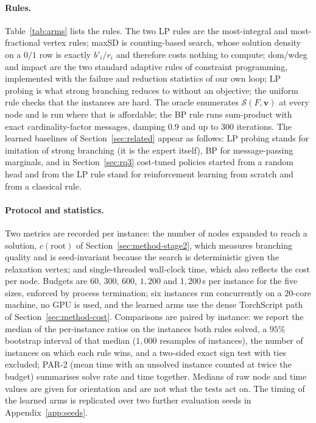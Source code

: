 \documentclass[final,5p,times,twocolumn,authoryear]{elsarticle}
\newcommand{\SOL}{\mathcal{S}}
\begin{document}
\paragraph{Rules.} Table~\ref{tab:arms} lists the rules. The two LP rules are the most-integral and most-fractional vertex rules; maxSD is counting-based search, whose solution density on a $0/1$ row is exactly $b'_i/r_i$ and therefore costs nothing to compute; dom/wdeg and impact are the two standard adaptive rules of constraint programming, implemented with the failure and reduction statistics of our own loop; LP probing is what strong branching reduces to without an objective; the uniform rule checks that the instances are hard. The oracle enumerates $\SOL(F,\mathbf{v})$ at every node and is run where that is affordable; the BP rule runs sum-product with exact cardinality-factor messages, damping $0.9$ and up to $300$ iterations. The learned baselines of Section~\ref{sec:related} appear as follows: LP probing stands for imitation of strong branching (it is the expert itself), BP for message-passing marginals, and in Section~\ref{sec:rq3} cost-tuned policies started from a random head and from the LP rule stand for reinforcement learning from scratch and from a classical rule.

\paragraph{Protocol and statistics.} Two metrics are recorded per instance: the number of nodes expanded to reach a solution, $c(\text{root})$ of Section~\ref{sec:method-stage2}, which measures branching quality and is seed-invariant because the search is deterministic given the relaxation vertex; and single-threaded wall-clock time, which also reflects the cost per node. Budgets are $60$, $300$, $600$, $1{,}200$ and $1{,}200$\,s per instance for the five sizes, enforced by process termination; six instances run concurrently on a $20$-core machine, no GPU is used, and the learned arms use the dense TorchScript path of Section~\ref{sec:method-cost}. Comparisons are paired by instance: we report the median of the per-instance ratios on the instances both rules solved, a $95\%$ bootstrap interval of that median ($1{,}000$ resamples of instances), the number of instances on which each rule wins, and a two-sided exact sign test with ties excluded; PAR-2 (mean time with an unsolved instance counted at twice the budget) summarises solve rate and time together. Medians of raw node and time values are given for orientation and are not what the tests act on. The timing of the learned arms is replicated over two further evaluation seeds in Appendix~\ref{app:seeds}.
\end{document}
